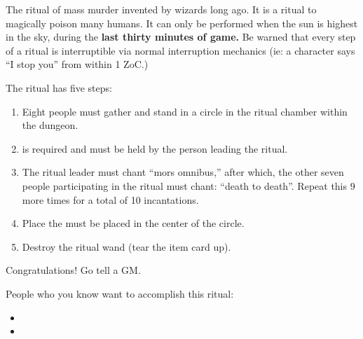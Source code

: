 \documentclass[green]{guildcamp2}
\begin{document}
\name{\gKillRitual{}}
The ritual of mass murder invented by wizards long ago. It is a ritual to magically poison many humans. It can only be performed when the sun is highest in the sky, during the {\bf last thirty minutes of game.} Be warned that every step of a ritual is interruptible via normal interruption mechanics (ie: a character says ``I stop you'' from within 1 ZoC.)

The ritual has five steps: 
\begin{enumerate}
\item Eight people must gather and stand in a circle in the ritual chamber within the dungeon.
\item \iRitualWand{} is required and must be held by the person leading the ritual.
\item The ritual leader must chant ``mors omnibus,'' after which, the other seven people participating in the ritual must chant: ``death to death''. Repeat this 9 more times for a total of 10 incantations.
\item Place the \iReaperIdol{} must be placed in the center of the circle.
\item Destroy the ritual wand (tear the item card up).
\end{enumerate}

Congratulations! Go tell a GM.




People who you know want to accomplish this ritual:
\begin{itemize}
\item \cRed{}
\item \cLich{}
\end{itemize}
      
\end{document}
